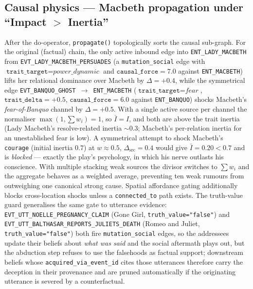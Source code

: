 \documentclass[11pt]{article}
\begin{document}
\subsection{Causal physics --- Macbeth propagation under
``Impact \texorpdfstring{$>$}{>} Inertia''}
\label{app:ex-causal}

After the do-operator, \texttt{propagate()} topologically sorts the
causal sub-graph. For the original (factual) chain, the only
active inbound edge into \texttt{ENT\_LADY\_MACBETH} from
\texttt{EVT\_LADY\_MACBETH\_PERSUADES} (a
\texttt{mutation\_social} edge with
$\texttt{trait\_target}=\textit{power\_dynamic}$ and
$\texttt{causal\_force}=7.0$ against
\texttt{ENT\_MACBETH}) lifts her relational dominance over
Macbeth by $\Delta = +0.4$, while the symmetrical edge
\texttt{EVT\_BANQUO\_GHOST $\to$ ENT\_MACBETH}
($\texttt{trait\_target}=\textit{fear}$,
$\texttt{trait\_delta}=+0.5$, $\texttt{causal\_force}=6.0$
against \texttt{ENT\_BANQUO}) shocks Macbeth's
\textit{fear-of-Banquo} channel by $\Delta = +0.5$. With a single
active source per channel the normaliser
$\max(1, \sum w_i) = 1$, so $\bar I = I$, and both are above the
trait inertia (Lady Macbeth's resolve-related inertia $\sim 0.3$;
Macbeth's per-relation inertia for an unestablished fear is
low). A symmetrical attempt to shock Macbeth's
\texttt{courage} (initial inertia $0.7$) at
$w \approx 0.5$, $\Delta_\text{src}=0.4$ would give
$\bar I = 0.20 < 0.7$ and is \emph{blocked} --- exactly the
play's psychology, in which his nerve outlasts his conscience.
With multiple stacking weak sources the divisor switches to
$\sum w_i$ and the aggregate behaves as a weighted average,
preventing ten weak rumours from outweighing one canonical
strong cause. Spatial affordance gating additionally blocks
cross-location shocks unless a \texttt{connected\_to} path
exists.
The truth-value guard generalises the same gate to utterance evidence:
\texttt{EVT\_UTT\_NOELLE\_PREGNANCY\_CLAIM} (Gone Girl,
\texttt{truth\_value="false"}) and
\texttt{EVT\_UTT\_BALTHASAR\_REPORTS\_JULIETS\_DEATH} (Romeo and
Juliet, \texttt{truth\_value="false"}) both fire
\texttt{mutation\_social} edges, so the addressees update their
beliefs about \emph{what was said} and the social aftermath plays
out, but the abduction step refuses to use the falsehoods as
factual support; downstream beliefs whose
\texttt{acquired\_via\_event\_id} cites those utterances therefore
carry the deception in their provenance and are pruned automatically
if the originating utterance is severed by a counterfactual.
\end{document}
